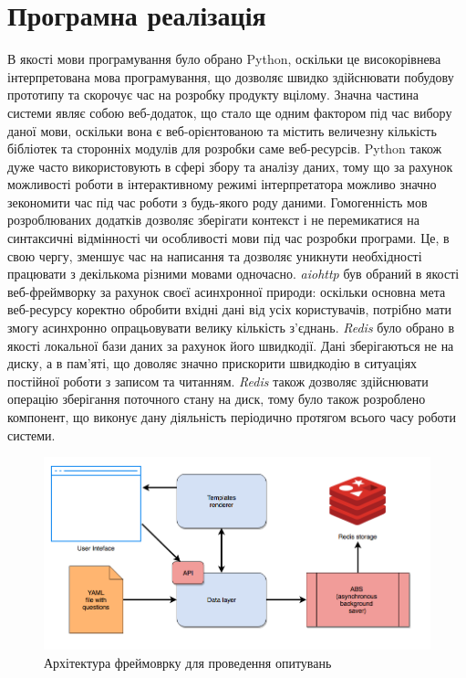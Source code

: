 \section{Програмна реалізація}
В якості мови програмування було обрано Python, оскільки це високорівнева інтерпретована мова програмування, що дозволяє швидко здійснювати побудову прототипу та скорочує час на розробку продукту вцілому. Значна частина системи являє собою веб-додаток, що стало ще одним фактором під час вибору даної мови, оскільки вона є веб-орієнтованою та містить величезну кількість бібліотек та сторонніх модулів для розробки саме веб-ресурсів. Python також дуже часто використовують в сфері збору та аналізу даних, тому що за рахунок можливості роботи в інтерактивному режимі інтерпретатора можливо значно зекономити час під час роботи з будь-якого роду даними. Гомогенність мов розроблюваних додатків дозволяє зберігати контекст і не перемикатися на синтаксичні відмінності чи особливості мови під час розробки програми. Це, в свою чергу, зменшує час на написання та дозволяє уникнути необхідності працювати з декількома різними мовами одночасно.
\textit{aiohttp} був обраний в якості веб-фреймворку за рахунок своєї асинхронної природи: оскільки основна мета веб-ресурсу коректно обробити вхідні дані від усіх користувачів, потрібно мати змогу асинхронно опрацьовувати велику кількість з'єднань. \textit{Redis} було обрано в якості локальної бази даних за рахунок його швидкодії. Дані зберігаються не на диску, а в пам'яті, що доволяє значно прискорити швидкодію в ситуаціях постійної роботи з записом та читанням. \textit{Redis} також дозволяє здійснювати операцію зберігання поточного стану на диск, тому було також розроблено компонент, що виконує дану діяльність періодично протягом всього часу роботи системи.

\begin{figure}[h!]
  \includegraphics[width=\linewidth]{figures/poll_framework_architecture.png}
  \caption{Архітектура фреймоврку для проведення опитувань}
  \label{fig:poll_framework_architecture}
\end{figure}

